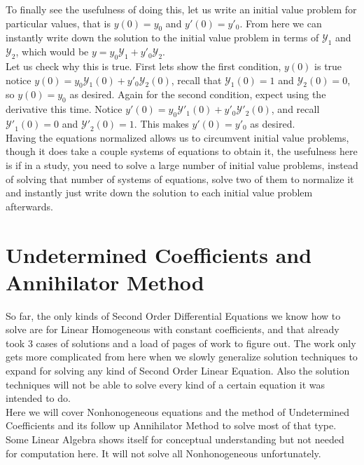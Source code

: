 \documentclass[12pt]{article}
\begin{document}
To finally see the usefulness of doing this, let us write an initial value problem for particular values, that is $y(0)=y_0$ and $y'(0)=y'_0$. From here we can instantly write down the solution to the initial value problem in terms of $\mathcal{Y}_1$ and $\mathcal{Y}_2$, which would be $y=y_0\mathcal{Y}_1+y'_0\mathcal{Y}_2$. \\

Let us check why this is true. First lets show the first condition, $y(0)$ is true notice $y(0)=y_0\mathcal{Y}_1(0)+y'_0\mathcal{Y}_2(0)$, recall that $\mathcal{Y}_1(0)=1$ and $\mathcal{Y}_2(0)=0$, so $y(0)=y_0$ as desired. Again for the second condition, expect using the derivative this time. Notice $y'(0)=y_0\mathcal{Y}'_1(0)+y'_0\mathcal{Y}'_2(0)$, and recall $\mathcal{Y'}_1(0)=0$ and $\mathcal{Y'}_2(0)=1$. This makes $y'(0)=y'_0$ as desired. \\

Having the equations normalized allows us to circumvent initial value problems, though it does take a couple systems of equations to obtain it, the usefulness here is if in a study, you need to solve a large number of initial value problems, instead of solving that number of systems of equations, solve two of them to normalize it and instantly just write down the solution to each initial value problem afterwards. \\

\section{Undetermined Coefficients and Annihilator Method}

So far, the only kinds of Second Order Differential Equations we know how to solve are for Linear Homogeneous with constant coefficients, and that already took 3 cases of solutions and a load of pages of work to figure out. The work only gets more complicated from here when we slowly generalize solution techniques to expand for solving any kind of Second Order Linear Equation. Also the solution techniques will not be able to solve every kind of a certain equation it was intended to do. \\

Here we will cover Nonhonogeneous equations and the method of Undetermined Coefficients and its follow up Annihilator Method to solve most of that type. Some Linear Algebra shows itself for conceptual understanding but not needed for computation here. It will not solve all Nonhonogeneous unfortunately.
\end{document}
